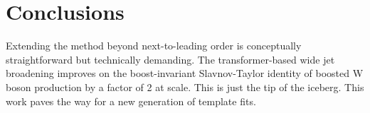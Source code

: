 \section{Conclusions}\label{sec:conclusions}

Extending the method beyond next-to-leading order is conceptually
straightforward but technically demanding. The transformer-based wide
jet broadening improves on the boost-invariant Slavnov-Taylor identity
of boosted W boson production by a factor of 2 at scale. This is just
the tip of the iceberg. This work paves the way for a new generation of
template fits.

